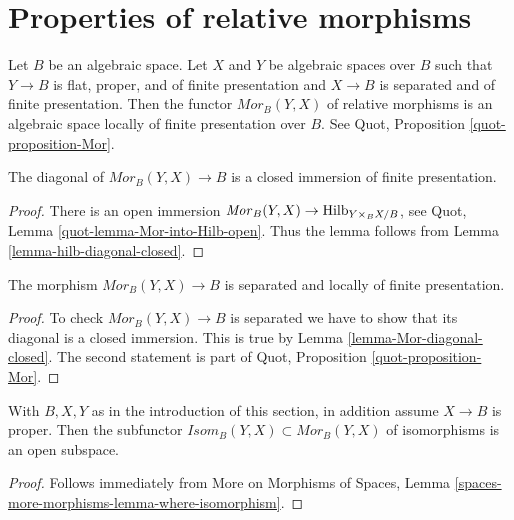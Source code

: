 \section{Properties of relative morphisms}
\label{section-relative-morphisms}

\noindent
Let $B$ be an algebraic space. Let $X$ and $Y$ be algebraic spaces
over $B$ such that $Y \to B$ is flat, proper, and of finite presentation
and $X \to B$ is separated and of finite presentation.
Then the functor $\mathit{Mor}_B(Y, X)$ of relative morphisms
is an algebraic space locally of finite presentation over $B$.
See Quot, Proposition \ref{quot-proposition-Mor}.

\begin{lemma}
\label{lemma-Mor-diagonal-closed}
The diagonal of $\mathit{Mor}_B(Y, X) \to B$ is a closed immersion
of finite presentation.
\end{lemma}

\begin{proof}
There is an open immersion
$\mathit{Mor}_B(Y, X) \to \mathrm{Hilb}_{Y \times_B X/B}$, see
Quot, Lemma \ref{quot-lemma-Mor-into-Hilb-open}.
Thus the lemma follows from
Lemma \ref{lemma-hilb-diagonal-closed}.
\end{proof}

\begin{lemma}
\label{lemma-Mor-s-lfp}
The morphism $\mathit{Mor}_B(Y, X) \to B$ is separated
and locally of finite presentation.
\end{lemma}

\begin{proof}
To check $\mathit{Mor}_B(Y, X) \to B$ is separated we have to
show that its diagonal is a closed immersion. This
is true by Lemma \ref{lemma-Mor-diagonal-closed}.
The second statement is part of
Quot, Proposition \ref{quot-proposition-Mor}.
\end{proof}

\begin{lemma}
\label{lemma-Isom-in-Mor}
With $B, X, Y$ as in the introduction of this section, in addition
assume $X \to B$ is proper. Then the
subfunctor $\mathit{Isom}_B(Y, X) \subset \mathit{Mor}_B(Y, X)$
of isomorphisms is an open subspace.
\end{lemma}

\begin{proof}
Follows immediately from More on Morphisms of Spaces, Lemma
\ref{spaces-more-morphisms-lemma-where-isomorphism}.
\end{proof}

